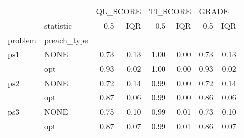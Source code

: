 \begin{tabular}{llrrrrrr}
\toprule
    & {} & \multicolumn{2}{l}{QL\_SCORE} & \multicolumn{2}{l}{TI\_SCORE} & \multicolumn{2}{l}{GRADE} \\
    & statistic &      0.5 &  IQR &      0.5 &  IQR &   0.5 &  IQR \\
problem & preach\_type &          &      &          &      &       &      \\
\midrule
ps1 & NONE &     0.73 & 0.13 &     1.00 & 0.00 &  0.73 & 0.13 \\
    & opt &     0.93 & 0.02 &     1.00 & 0.00 &  0.93 & 0.02 \\
ps2 & NONE &     0.72 & 0.14 &     0.99 & 0.00 &  0.72 & 0.14 \\
    & opt &     0.87 & 0.06 &     0.99 & 0.00 &  0.86 & 0.06 \\
ps3 & NONE &     0.75 & 0.10 &     0.99 & 0.01 &  0.73 & 0.10 \\
    & opt &     0.87 & 0.07 &     0.99 & 0.01 &  0.86 & 0.07 \\
\bottomrule
\end{tabular}
